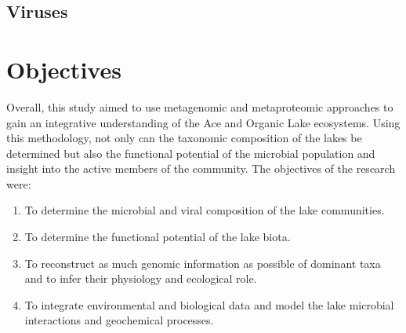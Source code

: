 \subsection{Viruses}


\section{Objectives}
Overall, this study aimed to use metagenomic and metaproteomic approaches to gain an integrative understanding of the Ace and Organic Lake ecosystems. 
Using this methodology, not only can the taxonomic composition of the lakes be determined but also the functional potential of the microbial population and insight into the active members of the community.
The objectives of the research were:

\begin{enumerate}
\item
  To determine the microbial and viral composition of the lake
  communities.

\item
  To determine the functional potential of the lake biota.

\item
  To reconstruct as much genomic information as possible of dominant taxa and to infer their physiology and ecological role.

\item
  To integrate environmental and biological data and model the lake microbial interactions and geochemical processes.

\end{enumerate}

